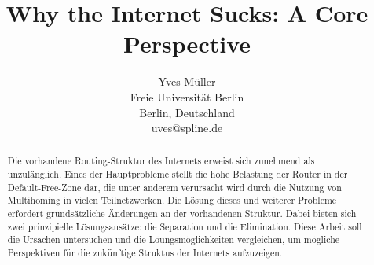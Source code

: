 \documentclass[11pt,a4paper]{article}
\author{Yves Müller \\ Freie Universität Berlin \\ Berlin, Deutschland \\ uves@spline.de}
\title{Why the Internet Sucks: A Core Perspective}
\date{}
\begin{document}
\maketitle

\begin{abstract}
Die vorhandene Routing-Struktur des Internets erweist sich zunehmend als unzulänglich. Eines der Hauptprobleme stellt die hohe Belastung der Router in der Default-Free-Zone dar, die unter anderem verursacht wird durch die Nutzung von Multihoming in vielen Teilnetzwerken. Die Lösung dieses und weiterer Probleme erfordert grundsätzliche Änderungen an der vorhandenen Struktur. Dabei bieten sich zwei prinzipielle Lösungsansätze: die Separation und die Elimination. Diese Arbeit soll die Ursachen untersuchen und die Löungsmöglichkeiten vergleichen, um mögliche Perspektiven für die zukünftige Struktus der Internets aufzuzeigen.
\end{abstract}

\tableofcontents











\end{document}
